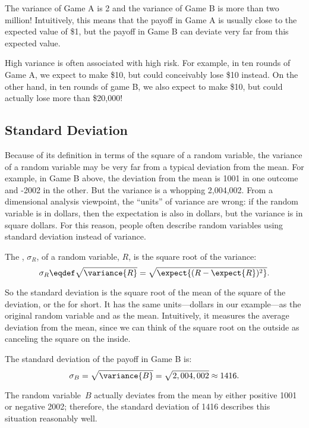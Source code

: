 The variance of Game A is 2 and the variance of Game B is more than
two million!  Intuitively, this means that the payoff in Game A is
usually close to the expected value of \$1, but the payoff in Game B
can deviate very far from this expected value.

High variance is often associated with high risk.  For example, in ten
rounds of Game A, we expect to make \$10, but could conceivably lose
\$10  instead.  On the other hand, in ten rounds of game B, we also
expect to make \$10, but could actually lose more than \$20,000!

\subsection{Standard Deviation}

Because of its definition in terms of the square of a random variable, the
variance of a random variable may be very far from a typical deviation
from the mean.  For example, in Game B above, the deviation from the mean
is 1001 in one outcome and -2002 in the other. But the variance is a
whopping 2,004,002.  From a dimensional analysis viewpoint, the ``units''
of variance are wrong: if the random variable is in dollars, then the
expectation is also in dollars, but the variance is in square dollars.
For this reason, people often describe random variables using standard
deviation instead of variance.

\begin{definition}
The , $\sigma_R$, of a random variable, $R$, is
the square root of the variance:
\[
\sigma_R \eqdef \sqrt{\variance{R}} = \sqrt{\expect{(R - \expect{R})^2}}.
\]
\end{definition}

So the standard deviation is the square root of the mean of the square of
the deviation, or the  for short.  It has the same
units---dollars in our example---as the original random variable and as
the mean.  Intuitively, it measures the average deviation from the mean,
since we can think of the square root on the outside as canceling the
square on the inside.

\begin{example}
The standard deviation of the payoff in Game B is:
\[
    \sigma_B  = \sqrt{\variance{B}} = \sqrt{2,004,002} \approx 1416.
\]

The random variable~$B$ actually deviates from the mean by either
positive 1001  or negative 2002; therefore, the standard
deviation of 1416 describes this situation reasonably well.
\end{example}

